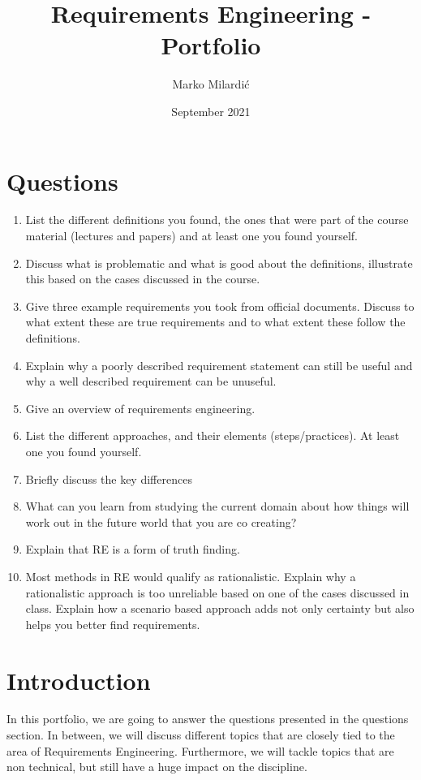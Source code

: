 \documentclass{article}
\title{Requirements Engineering - Portfolio}
\author{Marko Milardić}
\date{September 2021}
\begin{document}
\maketitle
\section{Questions}

\begin{enumerate}
\item List the different definitions you found, the ones that were part of the course material (lectures and papers) and at least one you found yourself.
\item Discuss what is problematic and what is good about the definitions, illustrate this based on the cases discussed in the course.
\item Give three example requirements you took from official documents. Discuss to what extent these are true requirements and to what extent these follow the definitions.
\item Explain why a poorly described requirement statement can still be useful and why a well described requirement can be unuseful. 
\item Give an overview of requirements engineering.
\item List the different approaches, and their elements (steps/practices). At least one you found yourself.
\item Briefly discuss the key differences
\item What can you learn from studying the current domain about how things will work out in the future world that you are co creating?
\item Explain that RE is a form of truth finding.
\item Most methods in RE would qualify as rationalistic. Explain why a rationalistic approach is too unreliable based on one of the cases discussed in class. Explain how a scenario based approach adds not only certainty but also helps you better find requirements. 
\end{enumerate}

\section{Introduction}
In this portfolio, we are going to answer the questions presented in the questions section. In between, we will discuss different topics that are closely tied to the area of Requirements Engineering. Furthermore, we will tackle topics that are non technical, but still have a huge impact on the discipline.
\end{document}
